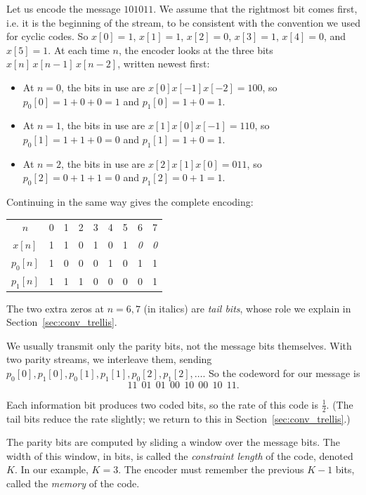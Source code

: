 Let us encode the message \(101011\). We assume that the rightmost bit comes first, i.e. it is the beginning of the stream, to be consistent with the convention we used for cyclic codes. So \(x[0] = 1\), \(x[1] = 1\), \(x[2] = 0\), \(x[3] = 1\), \(x[4] = 0\), and \(x[5] = 1\). At each time \(n\), the encoder looks at the three bits \(x[n]\,x[n-1]\,x[n-2]\), written newest first:
\begin{itemize}
    \item At \(n=0\), the bits in use are \(x[0]x[-1]x[-2] = 100\), so \(p_0[0] = 1 + 0 + 0 = 1\) and \(p_1[0] = 1 + 0 = 1\).
    \item At \(n=1\), the bits in use are \(x[1]x[0]x[-1]=110\), so \(p_0[1] = 1 + 1 + 0 = 0\) and \(p_1[1] = 1 + 0 = 1\).
    \item At \(n=2\), the bits in use are \(x[2]x[1]x[0]=011\), so \(p_0[2] = 0 + 1 + 1 = 0\) and \(p_1[2] = 0 + 1 = 1\).
\end{itemize}
Continuing in the same way gives the complete encoding:
\begin{center}
\begin{tabular}{c|cccccccc}
\hline
\(n\) & 0 & 1 & 2 & 3 & 4 & 5 & 6 & 7 \\
\(x[n]\) & 1 & 1 & 0 & 1 & 0 & 1 & \emph{0} & \emph{0} \\
\hline
\(p_0[n]\) & 1 & 0 & 0 & 0 & 1 & 0 & 1 & 1 \\
\(p_1[n]\) & 1 & 1 & 1 & 0 & 0 & 0 & 0 & 1 \\
\hline
\end{tabular}
\end{center}
The two extra zeros at \(n = 6, 7\) (in italics) are \emph{tail bits}, whose role we explain in Section~\ref{sec:conv_trellis}.

We usually transmit only the parity bits, not the message bits themselves. With two parity streams, we interleave them, sending \(p_0[0], p_1[0], p_0[1], p_1[1], p_0[2], p_1[2], \ldots\). So the codeword for our message is
\[11\ \ 01\ \ 01\ \ 00\ \ 10\ \ 00\ \ 10\ \ 11.\]

Each information bit produces two coded bits, so the rate of this code is \(\frac{1}{2}\). (The tail bits reduce the rate slightly; we return to this in Section~\ref{sec:conv_trellis}.)

The parity bits are computed by sliding a window over the message bits. The width of this window, in bits, is called the \emph{constraint length} of the code, denoted \(K\). In our example, \(K = 3\). The encoder must remember the previous \(K-1\) bits, called the \emph{memory} of the code.

